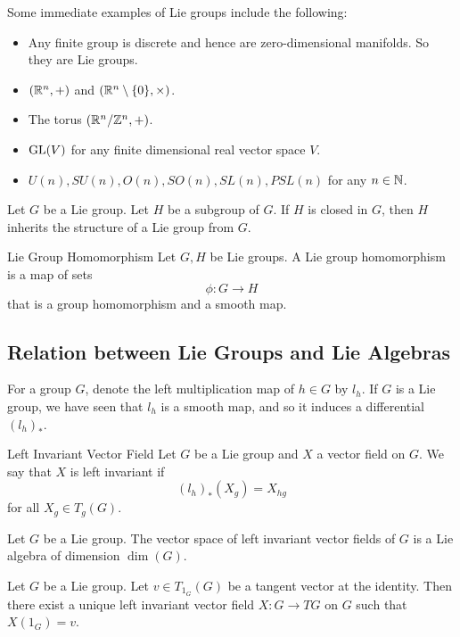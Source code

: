 \documentclass[a4paper]{article}
\begin{document}
Some immediate examples of Lie groups include the following: 
\begin{itemize}
\item Any finite group is discrete and hence are zero-dimensional manifolds. So they are Lie groups. 
\item $(\mathbb{R}^n,+)$ and $(\mathbb{R}^n\setminus\{0\},\times)$. 
\item The torus $(\mathbb{R}^n/\mathbb{Z}^n,+)$. 
\item $\operatorname{GL}(V)$ for any finite dimensional real vector space $V$. 
\item $U(n), SU(n), O(n), SO(n), SL(n), PSL(n)$ for any $n\in\mathbb{N}$. 
\end{itemize}

\begin{prp}{}{} Let $G$ be a Lie group. Let $H$ be a subgroup of $G$. If $H$ is closed in $G$, then $H$ inherits the structure of a Lie group from $G$. 
\end{prp}

\begin{defn}{Lie Group Homomorphism}{} Let $G,H$ be Lie groups. A Lie group homomorphism is a map of sets $$\phi:G\to H$$ that is a group homomorphism and a smooth map. 
\end{defn}

\subsection{Relation between Lie Groups and Lie Algebras}
For a group $G$, denote the left multiplication map of $h\in G$ by $l_h$. If $G$ is a Lie group, we have seen that $l_h$ is a smooth map, and so it induces a differential $(l_h)_\ast$. 

\begin{defn}{Left Invariant Vector Field}{} Let $G$ be a Lie group and $X$ a vector field on $G$. We say that $X$ is left invariant if $$(l_h)_\ast(X_g)=X_{hg}$$ for all $X_g\in T_g(G)$. 
\end{defn}

\begin{prp}{}{} Let $G$ be a Lie group. The vector space of left invariant vector fields of $G$ is a Lie algebra of dimension $\dim(G)$. 
\end{prp}

\begin{prp}{}{} Let $G$ be a Lie group. Let $v\in T_{1_G}(G)$ be a tangent vector at the identity. Then there exist a unique left invariant vector field $X:G\to TG$ on $G$ such that $X({1_G})=v$. 
\end{prp}
\end{document}
